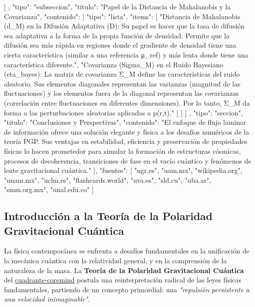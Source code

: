 \documentclass{article}
\begin{document}
{{{{            }
          ]
        },
        {
          "tipo": "subseccion",
          "titulo": "Papel de la Distancia de Mahalanobis y la Covarianza",
          "contenido": [
            {
              "tipo": "lista",
              "items": [
                "Distancia de Mahalanobis (d_M) en la Difusión Adaptativa (D): Su papel es hacer que la tasa de difusión sea adaptativa a la forma de la propia función de densidad. Permite que la difusión sea más rápida en regiones donde el gradiente de densidad tiene una cierta característica (similar a una referencia μ_ref) y más lenta donde tiene una característica diferente.",
                "Covarianza (Sigma_M) en el Ruido Bayesiano (eta_bayes): La matriz de covarianza Σ_M define las características del ruido aleatorio. Sus elementos diagonales representan las varianzas (magnitud de las fluctuaciones) y los elementos fuera de la diagonal representan las covarianzas (correlación entre fluctuaciones en diferentes dimensiones). Por lo tanto, Σ_M da forma a las perturbaciones aleatorias aplicadas a p(r,t)."
              ]
            }
          ]
        }
      ]
    },
    {
      "tipo": "seccion",
      "titulo": "Conclusiones y Perspectivas",
      "contenido": "El enfoque de flujo laminar de información ofrece una solución elegante y física a los desafíos numéricos de la teoría PGP. Sus ventajas en estabilidad, eficiencia y preservación de propiedades físicas lo hacen prometedor para simular la formación de estructuras cósmicas, procesos de decoherencia, transiciones de fase en el vacío cuántico y fenómenos de lente gravitacional cuántica."
    }
  ],
  "fuentes": [
    "ugr.es",
    "uam.mx",
    "wikipedia.org",
    "unam.mx",
    "uclm.es",
    "flashcards.world",
    "uva.es",
    "sld.cu",
    "uba.ar",
    "smm.org.mx",
    "unal.edu.co"
  ]
}
\subsection{Introducción a la Teoría de la Polaridad Gravitacional Cuántica}

La física contemporánea se enfrenta a desafíos fundamentales en la unificación de la mecánica cuántica con la relatividad general, y en la comprensión de la naturaleza de la masa. La \textbf{Teoría de la Polaridad Gravitacional Cuántica} del \href{https://github.com/cuadrante-coremind}{cuadrante-coremind} postula una reinterpretación radical de las leyes físicas fundamentales, partiendo de un concepto primordial: una \textit{"repulsión persistente a una velocidad inimaginable"}.
\end{document}
